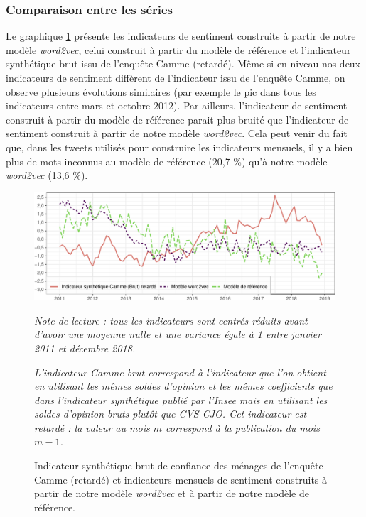 \documentclass[11pt,french,french]{article}
\begin{document}
\hypertarget{subsec:compseries}{%
\subsubsection{Comparaison entre les séries}\label{subsec:compseries}}

Le graphique \ref{fig:bslogcam} présente les indicateurs de sentiment construits à partir de notre modèle \emph{word2vec}, celui construit à partir du modèle de référence et l'indicateur synthétique brut issu de l'enquête Camme (retardé).
Même si en niveau nos deux indicateurs de sentiment diffèrent de l'indicateur issu de l'enquête Camme, on observe plusieurs évolutions similaires (par exemple le pic dans tous les indicateurs entre mars et octobre 2012).
Par ailleurs, l'indicateur de sentiment construit à partir du modèle de référence parait plus bruité que l'indicateur de sentiment construit à partir de notre modèle \emph{word2vec}.
Cela peut venir du fait que, dans les tweets utilisés pour construire les indicateurs mensuels, il y a bien plus de mots inconnus au modèle de référence (20,7 \%) qu'à notre modèle \emph{word2vec} (13,6 \%).

\begin{figure}[htp]
{\centering \includegraphics[width =\textwidth]{img/rmd-graphSentiments-1}}
\captionsetup{margin=0cm,format=hang,justification=justified}
\caption{Indicateur synthétique brut de confiance des ménages de l'enquête Camme (retardé) et indicateurs mensuels de sentiment construits à partir de notre modèle \emph{word2vec} et à partir de notre modèle de référence.}\label{fig:bslogcam}
\footnotesize
\emph{Note de lecture : tous les indicateurs sont centrés-réduits avant d'avoir une moyenne nulle et une variance égale à 1 entre janvier 2011 et décembre 2018.}

\emph{L'indicateur Camme brut correspond à l'indicateur que l'on obtient en utilisant les mêmes soldes d'opinion et les mêmes coefficients que dans l'indicateur synthétique publié par l'Insee mais en utilisant les soldes d'opinion bruts plutôt que CVS-CJO.
Cet indicateur est retardé : la valeur au mois $m$ correspond à la publication du mois $m-1$.}
\end{figure}
\end{document}
